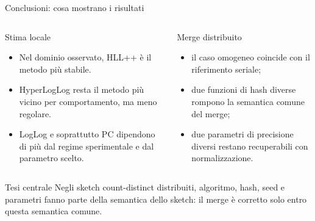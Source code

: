 \documentclass[aspectratio=169,11pt]{beamer}
\begin{document}
\begin{frame}{Conclusioni: cosa mostrano i risultati}
  \begin{columns}[T,onlytextwidth]
      \begin{block}{Stima locale}
        \footnotesize
        \begin{itemize}
          \item Nel dominio osservato, HLL++ \`e il metodo pi\`u stabile.
          \item HyperLogLog resta il metodo pi\`u vicino per comportamento, ma meno regolare.
          \item LogLog e soprattutto PC dipendono di pi\`u dal regime sperimentale e dal parametro scelto.
        \end{itemize}
      \end{block}
      \begin{block}{Merge distribuito}
        \footnotesize
        \begin{itemize}
          \item il caso omogeneo coincide con il riferimento seriale;
          \item due funzioni di hash diverse rompono la semantica comune del merge;
          \item due parametri di precisione diversi restano recuperabili con normalizzazione.
        \end{itemize}
      \end{block}
  \end{columns}

  \vspace{0.12cm}

  \begin{alertblock}{Tesi centrale}
    \footnotesize
    Negli sketch count-distinct distribuiti, algoritmo, hash, seed e parametri
    fanno parte della semantica dello sketch: il merge \`e corretto solo entro
    questa semantica comune.
  \end{alertblock}
\end{frame}
\end{document}
